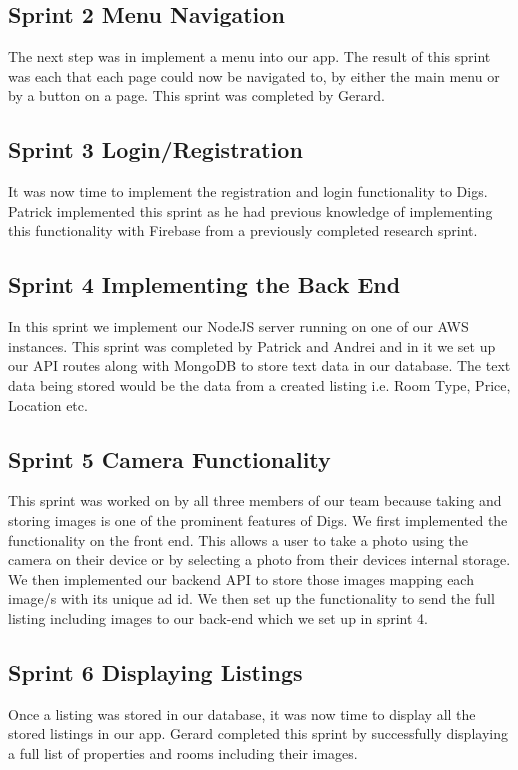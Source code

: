\subsection{Sprint 2 Menu Navigation}
The next step was in implement a menu into our app. The result of this sprint was each that each page could now be navigated to, by either the main menu or by a button on a page. This sprint was completed by Gerard.

\subsection{Sprint 3 Login/Registration}
It was now time to implement the registration and login functionality to Digs. Patrick implemented this sprint as he had previous knowledge of implementing this functionality with Firebase from a previously completed research sprint.

\subsection{Sprint 4 Implementing the Back End}
In this sprint we implement our NodeJS server running on one of our AWS instances. This sprint was completed by Patrick and Andrei and in it we set up our API routes along with MongoDB to store text data in our database. The text data being stored would be the data from a created listing i.e. Room Type, Price, Location etc.

\subsection{Sprint 5 Camera Functionality}
This sprint was worked on by all three members of our team because taking and storing images is one of the prominent features of Digs. We first implemented the functionality on the front end. This allows a user to take a photo using the camera on their device or by selecting a photo from their devices internal storage. We then implemented our backend API to store those images mapping each image/s with its unique ad id. We then set up the functionality to send the full listing including images to our back-end which we set up in sprint 4.

\subsection{Sprint 6 Displaying Listings}
Once a listing was stored in our database, it was now time to display all the stored listings in our app. Gerard completed this sprint by successfully displaying a full list of properties and rooms including their images.

